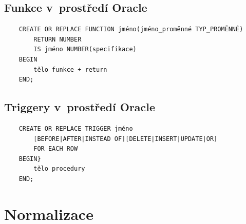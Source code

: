 \documentclass[a4paper,10pt]{article}
\begin{document}
    \subsection{Funkce v~prostředí Oracle}
    \begin{verbatim}
    CREATE OR REPLACE FUNCTION jméno(jméno_proměnné TYP_PROMĚNNÉ)
        RETURN NUMBER
        IS jméno NUMBER(specifikace)
    BEGIN
        tělo funkce + return
    END;
    \end{verbatim}

    \subsection{Triggery v~prostředí Oracle}
    \begin{verbatim}
    CREATE OR REPLACE TRIGGER jméno
        [BEFORE|AFTER|INSTEAD OF][DELETE|INSERT|UPDATE|OR]
        FOR EACH ROW
    BEGIN}
        tělo procedury
    END;
    \end{verbatim}

  \section{Normalizace}
\end{document}
